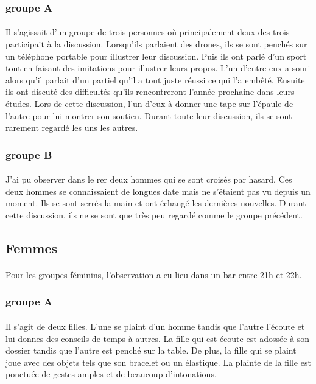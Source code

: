 \subsubsection{groupe A}
\paragraph{}
	Il s’agissait d’un groupe de trois personnes où principalement deux des trois participait à la discussion. Lorsqu’ils parlaient des drones, ils se sont penchés sur un téléphone portable pour illustrer leur discussion. Puis ils ont parlé d’un sport tout en faisant des imitations pour illustrer leurs propos. L’un d’entre eux a souri alors qu’il parlait d’un partiel qu’il a tout juste réussi ce qui l’a embêté. Ensuite ils ont discuté des difficultés qu’ils rencontreront l’année prochaine dans leurs études. Lors de cette discussion, l’un d’eux à donner une tape sur l’épaule de l’autre pour lui montrer son soutien. Durant toute leur discussion, ils se sont rarement regardé les uns les autres.
\subsubsection{groupe B}
\paragraph{}
	J’ai pu observer dans le rer deux hommes qui se sont croisés par hasard. Ces deux hommes se connaissaient de longues date mais ne s’étaient pas vu depuis un moment. Ils se sont serrés la main et ont échangé les dernières nouvelles. Durant cette discussion, ils ne se sont que très peu regardé comme le groupe précédent.
	
\subsection{Femmes}
\paragraph{}
Pour les groupes féminins, l’observation a eu lieu dans un bar entre 21h et 22h.
\subsubsection{groupe A}
\paragraph{}
	Il s’agit de deux filles. L’une se plaint d’un homme tandis que l’autre l’écoute et lui donnes des conseils de temps à autres. La fille qui est écoute est adossée à son dossier tandis que l’autre est penché sur la table. De plus, la fille qui se plaint joue avec des objets tels que son bracelet ou un élastique. La plainte de la fille est ponctuée de gestes amples et de beaucoup d’intonations.
